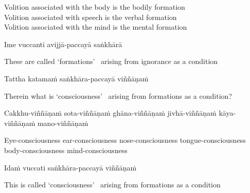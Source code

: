 \begin{english-verses}
  Volition associated with the body is the bodily formation\\
  Volition associated with speech is the verbal formation\\
  Volition associated with the mind is the mental\makeatletter\hyperlink{endnote79-appendix}\makeatother \thinspace
  formation
\end{english-verses}

Ime vuccanti avijjā-paccayā saṅkhārā

\begin{english}
  These are called `formations' \breathmark\ arising from ignorance as a condition
\end{english}

Tattha katamaṁ saṅkhāra-paccayā viññāṇaṁ

\begin{english-hang}
  Therein what is `consciousness' \breathmark\ arising from formations as a condition?
\end{english-hang}

\begin{pali-hang}
  Cakkhu-viññāṇaṁ sota-viññāṇaṁ ghāna-viññāṇaṁ jivhā-viññāṇaṁ kāya-viññāṇaṁ mano-viññāṇaṁ
\end{pali-hang}

\begin{english-hang}
  Eye-consciousness ear-consciousness nose-consciousness tongue-consciousness body-consciousness mind-consciousness
\end{english-hang}

Idaṁ vuccati saṅkhāra-paccayā viññāṇaṁ

\begin{english}
  This is called `consciousness' \breathmark\ arising from formations as a condition
\end{english}

